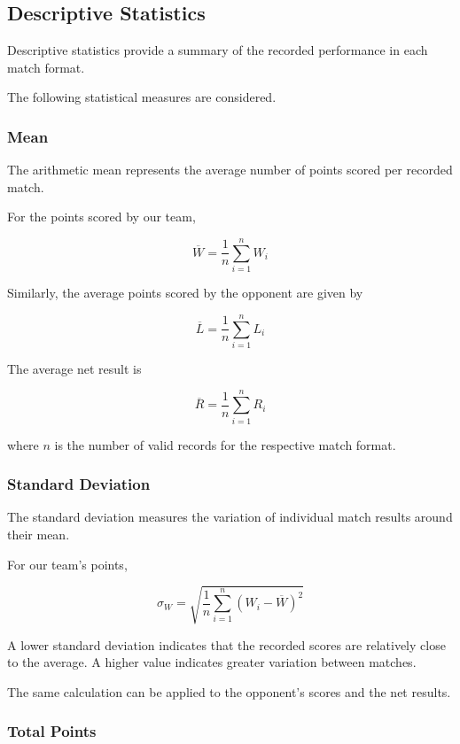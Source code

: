 \subsection{Descriptive Statistics}

Descriptive statistics provide a summary of the
recorded performance in each match format.

The following statistical measures are considered.

\subsubsection{Mean}

The arithmetic mean represents the average number of
points scored per recorded match.

For the points scored by our team,

\[
\overline{W} =
\frac{1}{n}\sum_{i=1}^{n} W_i
\]

Similarly, the average points scored by the opponent
are given by

\[
\overline{L} =
\frac{1}{n}\sum_{i=1}^{n} L_i
\]

The average net result is

\[
\overline{R} =
\frac{1}{n}\sum_{i=1}^{n} R_i
\]

where $n$ is the number of valid records for the
respective match format.

\subsubsection{Standard Deviation}

The standard deviation measures the variation of
individual match results around their mean.

For our team's points,

\[
\sigma_W =
\sqrt{
\frac{1}{n}
\sum_{i=1}^{n}
(W_i-\overline{W})^2
}
\]

A lower standard deviation indicates that the
recorded scores are relatively close to the average.
A higher value indicates greater variation between
matches.

The same calculation can be applied to the opponent's
scores and the net results.

\subsubsection{Total Points}

